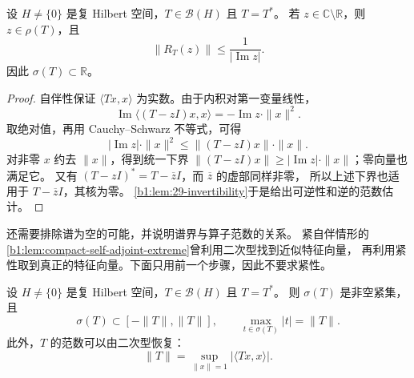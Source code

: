 \begin{proposition}[非实参数处的预解估计]
\label{b1:prop:29-self-adjoint-real-spectrum}
设 \(H\ne\{0\}\) 是复 Hilbert 空间，\(T\in\mathcal B(H)\) 且 \(T=T^*\)。
若 \(z\in\mathbb C\setminus\mathbb R\)，则 \(z\in\rho(T)\)，且
\[
 \|R_T(z)\|\leq\frac1{|\operatorname{Im}z|}.
\]
因此 \(\sigma(T)\subset\mathbb R\)。
\end{proposition}

\begin{proof}
自伴性保证 \(\langle Tx,x\rangle\) 为实数。由于内积对第一变量线性，
\[
 \operatorname{Im}\langle(T-zI)x,x\rangle
 =-\operatorname{Im}z\cdot\|x\|^2.
\]
取绝对值，再用 Cauchy--Schwarz 不等式，可得
\[
 |\operatorname{Im}z|\cdot\|x\|^2
 \leq\|(T-zI)x\|\cdot\|x\|.
\]
对非零 \(x\) 约去 \(\|x\|\)，得到统一下界
\(\|(T-zI)x\|\geq|\operatorname{Im}z|\cdot\|x\|\)；零向量也满足它。
又有 \((T-zI)^*=T-\overline zI\)，而 \(\overline z\) 的虚部同样非零，
所以上述下界也适用于 \(T-\overline zI\)，其核为零。
\cref{b1:lem:29-invertibility}于是给出可逆性和逆的范数估计。
\end{proof}

还需要排除谱为空的可能，并说明谱界与算子范数的关系。
紧自伴情形的\cref{b1:lem:compact-self-adjoint-extreme}曾利用二次型找到近似特征向量，
再利用紧性取到真正的特征向量。下面只用前一个步骤，因此不要求紧性。

\begin{theorem}[有界自伴算子的谱界]
\label{b1:thm:29-self-adjoint-spectral-bound}
设 \(H\ne\{0\}\) 是复 Hilbert 空间，\(T\in\mathcal B(H)\) 且 \(T=T^*\)。
则 \(\sigma(T)\) 是非空紧集，且
\[
 \sigma(T)\subset[-\|T\|,\|T\|],\qquad
 \max_{t\in\sigma(T)}|t|=\|T\|.
\]
此外，\(T\) 的范数可以由二次型恢复：
\[
 \|T\|=\sup_{\|x\|=1}|\langle Tx,x\rangle|.
\]
\end{theorem}

